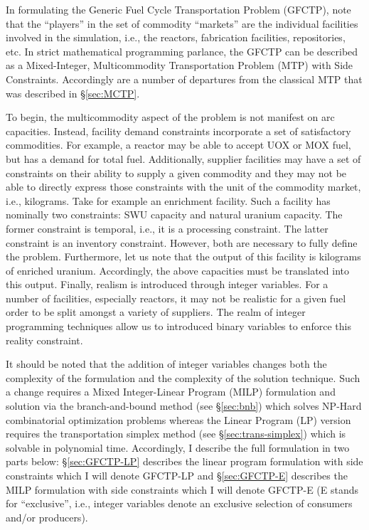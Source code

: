 
In formulating the Generic Fuel Cycle Transportation Problem (GFCTP), note that
the ``players'' in the set of commodity ``markets'' are the individual
facilities involved in the simulation, i.e., the reactors, fabrication
facilities, repositories, etc. In strict mathematical programming parlance, the
GFCTP can be described as a Mixed-Integer, Multicommodity Transportation Problem
(MTP) with Side Constraints. Accordingly are a number of departures from the
classical MTP that was described in \S\ref{sec:MCTP}.

To begin, the multicommodity aspect of the problem is not manifest on arc
capacities. Instead, facility demand constraints incorporate a set of
satisfactory commodities. For example, a reactor may be able to accept UOX or
MOX fuel, but has a demand for total fuel. Additionally, supplier facilities may
have a set of constraints on their ability to supply a given commodity and they
may not be able to directly express those constraints with the unit of the
commodity market, i.e., kilograms. Take for example an enrichment facility. Such
a facility has nominally two constraints: SWU capacity and natural uranium
capacity. The former constraint is temporal, i.e., it is a processing
constraint. The latter constraint is an inventory constraint. However, both are
necessary to fully define the problem. Furthermore, let us note that the output
of this facility is kilograms of enriched uranium. Accordingly, the above
capacities must be translated into this output. Finally, realism is introduced
through integer variables. For a number of facilities, especially reactors, it
may not be realistic for a given fuel order to be split amongst a variety of
suppliers. The realm of integer programming techniques allow us to introduced
binary variables to enforce this reality constraint.

It should be noted that the addition of integer variables changes both the
complexity of the formulation and the complexity of the solution technique. Such
a change requires a Mixed Integer-Linear Program (MILP) formulation and solution
via the branch-and-bound method (see \S\ref{sec:bnb}) which solves NP-Hard
combinatorial optimization problems whereas the Linear Program (LP) version
requires the transportation simplex method (see \S\ref{sec:trans-simplex})
which is solvable in polynomial time.  Accordingly, I describe the full
formulation in two parts below: \S\ref{sec:GFCTP-LP} describes the linear
program formulation with side constraints which I will denote GFCTP-LP
and \S\ref{sec:GFCTP-E} describes the MILP formulation with side constraints
which I will denote GFCTP-E (E stands for ``exclusive'', i.e., integer variables
denote an exclusive selection of consumers and/or producers).
